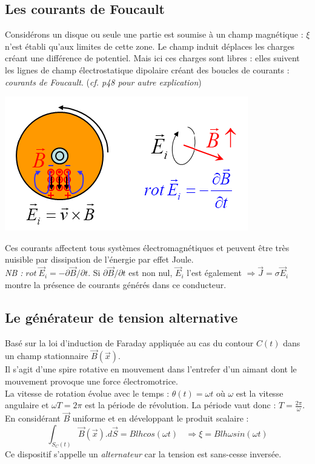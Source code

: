 \documentclass	[11pt, a4paper, openany]{book}
\begin{document}
\subsection{Les courants de Foucault}
Considérons un disque ou seule une partie est soumise à un champ magnétique : $\xi$ n'est établi qu'aux limites de cette zone. Le champ induit déplaces les charges créant une différence de potentiel. Mais ici ces charges sont libres : elles suivent les lignes de champ électrostatique dipolaire créant des boucles de courants : \textit{courants de Foucault}. (\textit{cf. p48 pour autre explication})
\begin{center}
\includegraphics[scale=0.45]{em/image19.png}\\
\end{center}
Ces courants affectent tous systèmes électromagnétiques et peuvent être très nuisible par dissipation de l'énergie par effet Joule. \\
\textit{NB :} $rot\ \vec{E}_i = -\partial\vec{B}/\partial t$. Si $\partial\vec{B}/\partial t$ est non nul, $\vec{E}_i$ l'est également $\Rightarrow \vec{J} = \sigma\vec{E}_i$ montre la présence de courants générés dans ce conducteur.

\subsection{Le générateur de tension alternative}
Basé sur la loi d'induction de Faraday appliquée au cas du contour $C(t)$ dans un champ stationnaire $\vec{B}(\vec{x})$.\\
Il s'agit d'une spire rotative en mouvement dans l'entrefer d'un aimant dont le mouvement provoque une force électromotrice.\\
La vitesse de rotation évolue avec le temps : $\theta (t) = \omega t$ où $\omega$ est la vitesse angulaire et $\omega T = 2\pi$ est la période de révolution. La période vaut donc : $T = \frac{2\pi}{\omega}$. En considérant $\vec{B}$ uniforme et en développant le produit scalaire : 
\begin{equation}
\int_{S_C(t)} \vec{B}(\vec{x}).d\vec{S} = Blhcos(\omega t)\ \ \ \ \Rightarrow \xi = Blh\omega sin(\omega t)
\end{equation}
Ce dispositif s'appelle un \textit{alternateur} car la tension est sans-cesse inversée.
\end{document}
